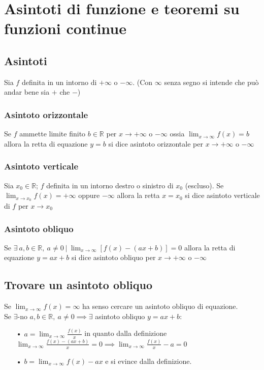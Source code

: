 \chapter{Asintoti di funzione e teoremi su funzioni continue}
\section{Asintoti}
Sia $f$ definita in un intorno di $+\infty$ o $-\infty$. (Con $\infty$ senza segno si intende che può andar bene sia $+$ che $-$)
\subsection{Asintoto orizzontale}
Se $f$ ammette limite finito $b \in \mathbb{R}$ per $x \to +\infty$ o $-\infty$ ossia $\displaystyle \lim_{x \to \infty}f(x) = b$ allora la retta di equazione $y = b$ si dice asintoto orizzontale per $x \to +\infty$ o $-\infty$
\subsection{Asintoto verticale}
Sia $x_0 \in \mathbb{R}$; $f$ definita in un intorno destro o sinistro di $x_0$ (escluso). Se $\displaystyle \lim_{x \to x_0}f(x) = +\infty$ oppure $-\infty$ allora la retta $x = x_0$ si dice asintoto verticale di $f$ per $x \to x_0$
\subsection{Asintoto obliquo}
Se $\exists\ a,b \in \mathbb{R},\ a \neq 0\ |\ \displaystyle \lim_{x \to \infty}[f(x) - (ax + b)] = 0$ allora la retta di equazione $y = ax + b$ si dice asintoto obliquo per $x \to +\infty$ o $-\infty$

\section{Trovare un asintoto obliquo}
Se $\displaystyle \lim_{x \to \infty}f(x) = \infty$ ha senso cercare un asintoto obliquo di equazione.\\
Se $\exists \text{-no } a,b \in \mathbb{R},\ a \neq 0 \implies \exists$ asintoto obliquo $y = ax + b$:
\begin{enumerate}
\item[•] $a = \displaystyle \lim_{x \to \infty} \frac{f(x)}{x}$ in quanto dalla definizione $\displaystyle \lim_{x \to \infty} \frac{f(x) - (ax + b)}{x} = 0 \implies \displaystyle \lim_{x \to \infty}\frac{f(x)}{x} - a = 0$
\item[•] $b  =\displaystyle \lim_{x \to \infty}f(x) - ax$ e si evince dalla definizione.
\end{enumerate}
